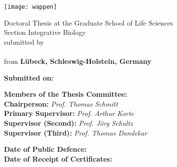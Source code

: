 \documentclass[
12pt, %
english, %
doublespacing, %
headsepline, %
chapterinoneline, %
]{MastersDoctoralThesis} %
\author{Jan Alexander \textsc{Freudenthal}} %
\begin{document}
 
\frontmatter %

\pagestyle{plain} 


\begin{titlepage}
  \begin{center}
    {\scshape\LARGE
       \univname\par}\vspace{1.0cm}
    \texttt{[image: wappen]}
    \vspace{1.0cm}
    
    {\color{mdtRed}\LARGE \ttitle\par}
    \vspace{1.0cm}
    
    Doctoral Thesis at the Graduate School of Life Sciences \\
    Section Integrative Biology \\
    submitted by \\
    \vspace{1.0cm}
    \color{mdtRed}{\LARGE\authorname} \\
    \vspace{1.0cm}
    \color{black}from
    \textbf{L\"{u}beck, Schleswig-Holstein, Germany}
    
    
  \end{center}
  \newpage
  
  \vspace{.1\textheight}
  \textbf{Submitted on:} \dotfill\\
  
  \vspace{.1\textheight}
  \begin{centering}
    {\Large\textbf{Members of the Thesis Committee:}} \\
      \vspace{.1\textheight}
      {\Large
      \textbf{Chairperson: }\textit{Prof. Thomas Schmitt} \\
      \textbf{Primary Supervisor: }\textit{Prof. Arthur Korte} \\
      \textbf{Supervisor (Second):  }\textit{Prof. J\"{o}rg Schultz } \\
      \textbf{Supervisor (Third):  }\textit{Prof. Thomas Dandekar} \\
      }
    \end{centering}
    \vspace{0.2\textheight}
    \noindent
    \textbf{Date of Public Defence:} \dotfill \\
    \textbf{Date of Receipt of Certificates:}\dotfill
  
  
\end{titlepage}
\end{document}
